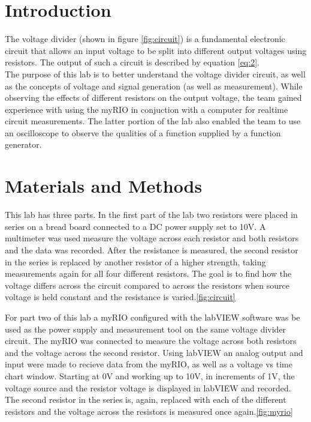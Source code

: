 \documentclass[10pt,twocolumn]{article}
\begin{document}


\section{Introduction} 
\label{sec:introduction}

The voltage divider (shown in figure \ref{fig:circuit}) is a fundamental electronic circuit that allows an input voltage to be split into different output voltages using resistors. The output of such a circuit is described by equation \ref{eq:2}.\\
The purpose of this lab is to better understand the voltage divider circuit, as well as the concepts of voltage and signal generation (as well as measurement). While observing the effects of different resistors on the output voltage, the team gained experience with using the myRIO in conjuction with a computer for realtime circuit measurements. The latter portion of the lab also enabled the team to use an oscilloscope to observe the qualities of a function supplied by a function generator.

\section{Materials and Methods}

	This lab has three parts. In the first part of the lab two resistors were placed in series on a bread board connected to a DC power supply set to 10V. A multimeter was used measure the voltage across each resistor and both resistors and the data was recorded. After the resistance is measured, the second resistor in the series is replaced by another resistor of a higher strength, taking measurements again for all four different resistors. The goal is to find how the voltage differs across the circuit compared to across the resistors when source voltage is held constant and the resistance is varied.\autoref{fig:circuit}
	
	
	For part two of this lab a myRIO configured with the labVIEW software was be used as the power supply and measurement tool on the same voltage divider circuit. The myRIO was connected to measure the voltage across both resistors and the voltage across the second resistor. Using labVIEW an analog output and input were made to recieve data from the myRIO, as well as a voltage vs time chart window. Starting at 0V and working up to 10V, in increments of 1V, the voltage source and the resistor voltage is displayed in labVIEW and recorded. The second resistor in the series is, again, replaced with each of the different resistors and the voltage across the resistors is measured once again.\autoref{fig:myrio} 
	
\end{document}
